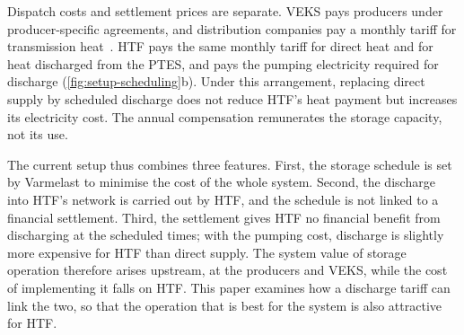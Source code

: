 Dispatch costs and settlement prices are separate. VEKS pays producers under producer-specific agreements, and distribution companies pay a monthly tariff for transmission heat~\cite{varmelast_local_production}. HTF pays the same monthly tariff for direct heat and for heat discharged from the PTES, and pays the pumping electricity required for discharge (\cref{fig:setup-scheduling}b). Under this arrangement, replacing direct supply by scheduled discharge does not reduce HTF's heat payment but increases its electricity cost. The annual compensation remunerates the storage capacity, not its use.

The current setup thus combines three features. First, the storage schedule is set by Varmelast to minimise the cost of the whole system. Second, the discharge into HTF's network is carried out by HTF, and the schedule is not linked to a financial settlement. Third, the settlement gives HTF no financial benefit from discharging at the scheduled times; with the pumping cost, discharge is slightly more expensive for HTF than direct supply. The system value of storage operation therefore arises upstream, at the producers and VEKS, while the cost of implementing it falls on HTF. This paper examines how a discharge tariff can link the two, so that the operation that is best for the system is also attractive for HTF.
